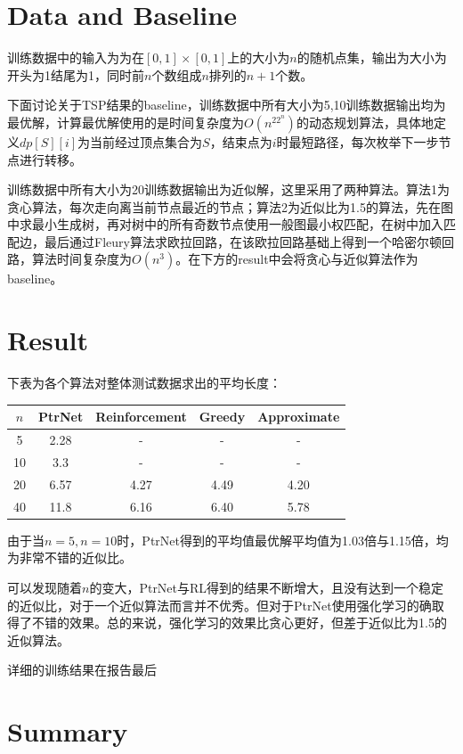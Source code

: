 \documentclass[a4paper]{article}
\begin{document}
\section*{Data and Baseline}

训练数据中的输入为为在$[0,1]×[0,1]$上的大小为$n$的随机点集，输出为大小为开头为1结尾为1，同时前$n$个数组成$n$排列的$n+1$个数。

下面讨论关于TSP结果的baseline，训练数据中所有大小为5,10训练数据输出均为最优解，计算最优解使用的是时间复杂度为$O(n^22^n)$的动态规划算法，具体地定义$dp[S][i]$为当前经过顶点集合为$S$，结束点为$i$时最短路径，每次枚举下一步节点进行转移。

训练数据中所有大小为20训练数据输出为近似解，这里采用了两种算法。算法1为贪心算法，每次走向离当前节点最近的节点；算法2为近似比为1.5的算法，先在图中求最小生成树，再对树中的所有奇数节点使用一般图最小权匹配，在树中加入匹配边，最后通过Fleury算法求欧拉回路，在该欧拉回路基础上得到一个哈密尔顿回路，算法时间复杂度为$O(n^3)$。在下方的result中会将贪心与近似算法作为baseline。

\section*{Result}

下表为各个算法对整体测试数据求出的平均长度：

\begin{tabular}{c|c|c|c|c}
    $n$ & PtrNet & Reinforcement & Greedy & Approximate  \\ \hline
    5 & 2.28 & - & - & - \\
    10 & 3.3 & - & - & - \\
    20 & 6.57 & 4.27 & 4.49 & 4.20 \\
    40 & 11.8 & 6.16 & 6.40 & 5.78 \\ \hline
\end{tabular}

由于当$n=5,n=10$时，PtrNet得到的平均值最优解平均值为1.03倍与1.15倍，均为非常不错的近似比。

可以发现随着$n$的变大，PtrNet与RL得到的结果不断增大，且没有达到一个稳定的近似比，对于一个近似算法而言并不优秀。但对于PtrNet使用强化学习的确取得了不错的效果。总的来说，强化学习的效果比贪心更好，但差于近似比为1.5的近似算法。

详细的训练结果在报告最后

\section*{Summary}
\end{document}
